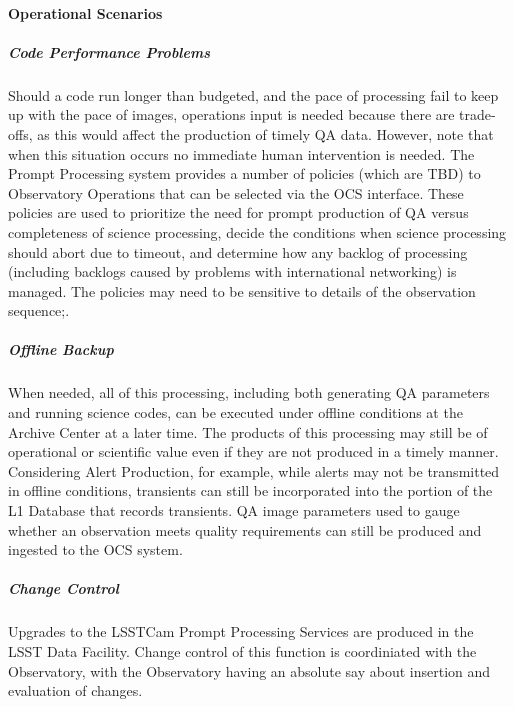 \paragraph{Operational Scenarios}

\subparagraph{Code Performance Problems} 
Should a code run longer than budgeted, and the pace of processing
fail to keep up with the pace of images, operations input is needed
because there are trade-offs, as this would affect the production of
timely QA data.  However, note that when this situation occurs no
immediate human intervention is needed.  The Prompt Processing system
provides a number of policies (which are TBD) to Observatory
Operations that can be selected via the OCS interface.  These policies
are used to prioritize the need for prompt production of QA versus
completeness of science processing, decide the conditions when science
processing should abort due to timeout, and determine how any backlog
of processing (including backlogs caused by problems with
international networking) is managed.  The policies may need to be
sensitive to details of the observation sequence;.

\subparagraph{Offline Backup} 
When needed, all of this processing, including both generating QA
parameters and running science codes, can be executed under offline
conditions at the Archive Center at a later time.  The products of
this processing may still be of operational or scientific value even
if they are not produced in a timely manner.  Considering Alert
Production, for example, while alerts may not be transmitted in
offline conditions, transients can still be incorporated into the
portion of the L1 Database that records transients.  QA image
parameters used to gauge whether an observation meets quality
requirements can still be produced and ingested to the OCS system.

\subparagraph{Change Control}
Upgrades to the LSSTCam Prompt Processing Services are produced in the LSST Data Facility. Change control 
of this function is coordiniated with the Observatory, with the Observatory having an absolute say
about insertion and evaluation of changes.
